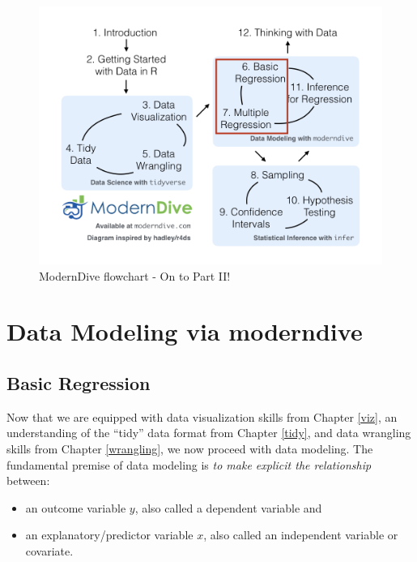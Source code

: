 \documentclass[12pt, krantz2,]{krantz}
\providecommand{\tightlist}{%
  \setlength{\itemsep}{0pt}\setlength{\parskip}{0pt}}
\begin{document}
\begin{figure}

{\centering \includegraphics[width=\textwidth]{images/flowcharts/flowchart/flowchart.005} 

}

\caption{ModernDive flowchart - On to Part II!}\label{fig:unnamed-chunk-141}
\end{figure}

\hypertarget{part-data-modeling-via-moderndive}{%
\part{Data Modeling via moderndive}\label{part-data-modeling-via-moderndive}}

\hypertarget{regression}{%
\chapter{Basic Regression}\label{regression}}

Now that we are equipped with data visualization skills from Chapter \ref{viz}, an understanding of the ``tidy'' data format from Chapter \ref{tidy}, and data wrangling skills from Chapter \ref{wrangling}, we now proceed with data modeling. The fundamental premise of data modeling is \emph{to make explicit the relationship} between:

\begin{itemize}
\tightlist
\item
  an outcome variable \(y\), also called a dependent variable and
\item
  an explanatory/predictor variable \(x\), also called an independent variable or covariate.
\end{itemize}
\end{document}
